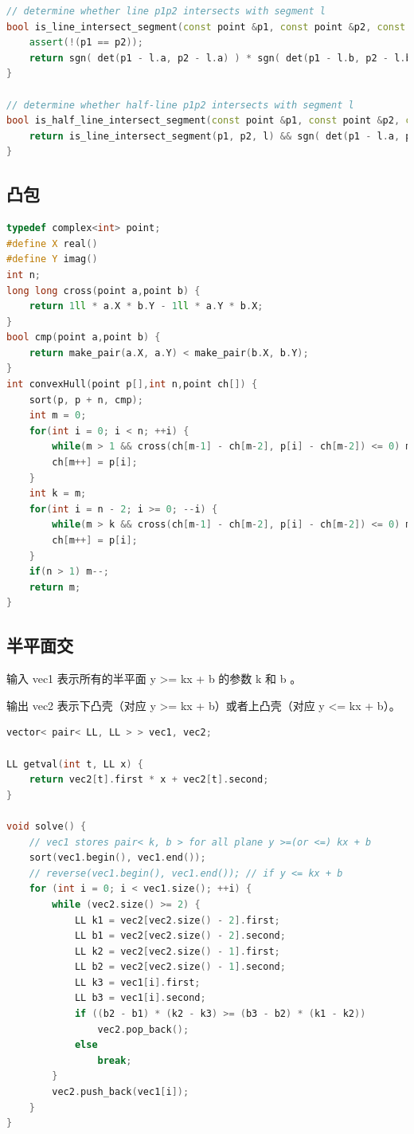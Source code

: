 \documentclass{article}
\begin{document}
\begin{lstlisting}[language=C++]
// determine whether line p1p2 intersects with segment l
bool is_line_intersect_segment(const point &p1, const point &p2, const segment &l) {
	assert(!(p1 == p2));
	return sgn( det(p1 - l.a, p2 - l.a) ) * sgn( det(p1 - l.b, p2 - l.b) ) <= 0;
}

// determine whether half-line p1p2 intersects with segment l
bool is_half_line_intersect_segment(const point &p1, const point &p2, const segment &l) {
	return is_line_intersect_segment(p1, p2, l) && sgn( det(p1 - l.a, p2 - l.a) ) * sgn( det(p1 - l.a, l.b - l.a) ) >= 0;
}

\end{lstlisting}

\subsection{凸包}
\begin{lstlisting}[language=C++]
typedef complex<int> point;
#define X real()
#define Y imag()
int n;
long long cross(point a,point b) {
	return 1ll * a.X * b.Y - 1ll * a.Y * b.X;
}
bool cmp(point a,point b) {
	return make_pair(a.X, a.Y) < make_pair(b.X, b.Y);
}
int convexHull(point p[],int n,point ch[]) {
	sort(p, p + n, cmp);
	int m = 0;
	for(int i = 0; i < n; ++i) {
		while(m > 1 && cross(ch[m-1] - ch[m-2], p[i] - ch[m-2]) <= 0) m--;
		ch[m++] = p[i];
	}
	int k = m;
	for(int i = n - 2; i >= 0; --i) {
		while(m > k && cross(ch[m-1] - ch[m-2], p[i] - ch[m-2]) <= 0) m--;
		ch[m++] = p[i];
	}
	if(n > 1) m--;
	return m;
}
\end{lstlisting}

\subsection{半平面交}

输入 vec1 表示所有的半平面 y >= kx + b 的参数 k 和 b 。

输出 vec2 表示下凸壳（对应 y >= kx + b）或者上凸壳（对应 y <= kx + b）。

\begin{lstlisting}[language=C++]
vector< pair< LL, LL > > vec1, vec2;

LL getval(int t, LL x) {
	return vec2[t].first * x + vec2[t].second;
}

void solve() {
	// vec1 stores pair< k, b > for all plane y >=(or <=) kx + b
	sort(vec1.begin(), vec1.end());
	// reverse(vec1.begin(), vec1.end()); // if y <= kx + b
	for (int i = 0; i < vec1.size(); ++i) {
		while (vec2.size() >= 2) {
			LL k1 = vec2[vec2.size() - 2].first;
			LL b1 = vec2[vec2.size() - 2].second;
			LL k2 = vec2[vec2.size() - 1].first;
			LL b2 = vec2[vec2.size() - 1].second;
			LL k3 = vec1[i].first;
			LL b3 = vec1[i].second;
			if ((b2 - b1) * (k2 - k3) >= (b3 - b2) * (k1 - k2))
				vec2.pop_back();
			else
				break;
		}
		vec2.push_back(vec1[i]);
	}
}
\end{lstlisting}
\end{document}
